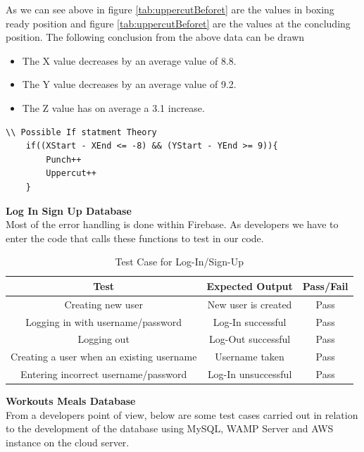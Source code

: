 \documentclass[a4paper,12pt]{report}
\begin{document}
As we can see above in figure \ref{tab:uppercutBeforet} are the values in boxing ready position and figure \ref{tab:uppercutBeforet} are the values at the concluding position.
The following conclusion from the above data can be drawn 
\begin{itemize}
    \item The X value decreases by an average value of 8.8.
    \item The Y value decreases by an average value of 9.2.
    \item The Z value has on average a 3.1 increase.
\end{itemize}
\begin{verbatim}
\\ Possible If statment Theory
    if((XStart - XEnd <= -8) && (YStart - YEnd >= 9)){
        Punch++
        Uppercut++
    }
\end{verbatim}

\textbf{Log In Sign Up Database}\\
Most of the error handling is done within Firebase. As developers we have to enter the code that calls these functions to test in our code.  

\begin{table}[h]
    \centering
    \begin{tabular}{||c c c||} 
     \hline
     \textbf{Test} & \textbf{Expected Output} & \textbf{Pass/Fail} \\ [0.5ex] 
     \hline\hline
     Creating new user & New user is created & Pass \\ 
     \hline
     Logging in with username/password & Log-In successful & Pass \\  
     \hline
     Logging out & Log-Out successful & Pass \\
     \hline
     Creating a user when an existing username & Username taken & Pass \\
     \hline
     Entering incorrect username/password & Log-In unsuccessful & Pass \\
     \hline
    \end{tabular}
    \caption{Test Case for Log-In/Sign-Up}
    \label{tab:LogInTest}
\end{table}

\textbf{Workouts Meals Database}\\
From a developers point of view, below are some test cases carried out in relation to the development of the database using MySQL, WAMP Server and AWS instance on the cloud server.
\end{document}
